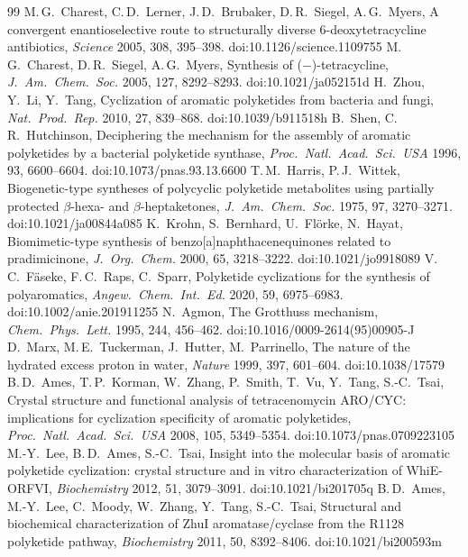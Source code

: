 \documentclass[11pt]{article}
\begin{document}
\begin{thebibliography}{99}\small
{} M.\,G.\ Charest, C.\,D.\ Lerner, J.\,D.\ Brubaker, D.\,R.\ Siegel, A.\,G.\ Myers, A convergent enantioselective route to structurally diverse 6-deoxytetracycline antibiotics, \textit{Science} 2005, 308, 395--398. doi:10.1126/science.1109755
 M.\,G.\ Charest, D.\,R.\ Siegel, A.\,G.\ Myers, Synthesis of ($-$)-tetracycline, \textit{J.\ Am.\ Chem.\ Soc.} 2005, 127, 8292--8293. doi:10.1021/ja052151d
 H.\ Zhou, Y.\ Li, Y.\ Tang, Cyclization of aromatic polyketides from bacteria and fungi, \textit{Nat.\ Prod.\ Rep.} 2010, 27, 839--868. doi:10.1039/b911518h
 B.\ Shen, C.\,R.\ Hutchinson, Deciphering the mechanism for the assembly of aromatic polyketides by a bacterial polyketide synthase, \textit{Proc.\ Natl.\ Acad.\ Sci.\ USA} 1996, 93, 6600--6604. doi:10.1073/pnas.93.13.6600
 T.\,M.\ Harris, P.\,J.\ Wittek, Biogenetic-type syntheses of polycyclic polyketide metabolites using partially protected $\beta$-hexa- and $\beta$-heptaketones, \textit{J.\ Am.\ Chem.\ Soc.} 1975, 97, 3270--3271. doi:10.1021/ja00844a085
 K.\ Krohn, S.\ Bernhard, U.\ Flörke, N.\ Hayat, Biomimetic-type synthesis of benzo[a]naphthacenequinones related to pradimicinone, \textit{J.\ Org.\ Chem.} 2000, 65, 3218--3222. doi:10.1021/jo9918089
 V.\,C.\ Fäseke, F.\,C.\ Raps, C.\ Sparr, Polyketide cyclizations for the synthesis of polyaromatics, \textit{Angew.\ Chem.\ Int.\ Ed.} 2020, 59, 6975--6983. doi:10.1002/anie.201911255
 N.\ Agmon, The Grotthuss mechanism, \textit{Chem.\ Phys.\ Lett.} 1995, 244, 456--462. doi:10.1016/0009-2614(95)00905-J
 D.\ Marx, M.\,E.\ Tuckerman, J.\ Hutter, M.\ Parrinello, The nature of the hydrated excess proton in water, \textit{Nature} 1999, 397, 601--604. doi:10.1038/17579
 B.\,D.\ Ames, T.\,P.\ Korman, W.\ Zhang, P.\ Smith, T.\ Vu, Y.\ Tang, S.-C.\ Tsai, Crystal structure and functional analysis of tetracenomycin ARO/CYC: implications for cyclization specificity of aromatic polyketides, \textit{Proc.\ Natl.\ Acad.\ Sci.\ USA} 2008, 105, 5349--5354. doi:10.1073/pnas.0709223105
 M.-Y.\ Lee, B.\,D.\ Ames, S.-C.\ Tsai, Insight into the molecular basis of aromatic polyketide cyclization: crystal structure and in vitro characterization of WhiE-ORFVI, \textit{Biochemistry} 2012, 51, 3079--3091. doi:10.1021/bi201705q
 B.\,D.\ Ames, M.-Y.\ Lee, C.\ Moody, W.\ Zhang, Y.\ Tang, S.-C.\ Tsai, Structural and biochemical characterization of ZhuI aromatase/cyclase from the R1128 polyketide pathway, \textit{Biochemistry} 2011, 50, 8392--8406. doi:10.1021/bi200593m

\end{thebibliography}
\end{document}
